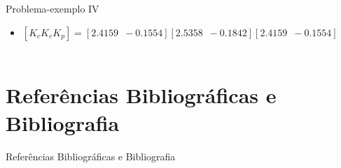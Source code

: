 \documentclass[aspectratio=169,11pt,t,xcolor={usenames,dvipsnames,x11names}]{beamer}
\begin{document}
\begin{frame}{Problema-exemplo IV}
	\begin{itemize}
			\item $\left[K_cK_eK_p\right] = \left[2.4159 \enspace -0.1554\right] \left[2.5358 \enspace -0.1842\right] \left[2.4159 \enspace -0.1554\right]$\\~\\
		\end{itemize}
	\begin{figure}[!ht]
		\centering
	  
	\end{figure}
\end{frame}

\section{Referências Bibliográficas e Bibliografia}
\begin{frame}[allowframebreaks]{Referências Bibliográficas e Bibliografia}
	\small
	
	
	\nocite{*}
\end{frame}
\end{document}
